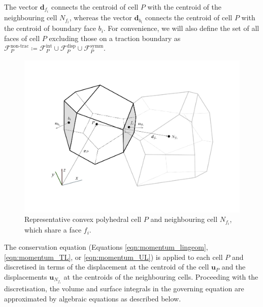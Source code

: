 \documentclass[sn-mathphys,Numbered]{sn-jnl}%
\newcommand{\bb}{\boldsymbol}
\begin{document}
The vector $\mathbf{d}_{f_i}$ connects the centroid of cell $P$ with the centroid of the neighbouring cell $N_{f_i}$, whereas the vector $\mathbf{d}_{b_i}$ connects the centroid of cell $P$ with the centroid of boundary face ${b_i}$.
For convenience, we will also define the set of all faces of cell $P$ excluding those on a traction boundary as $\mathcal{F}_P^{\text{non-trac}} \coloneqq \mathcal{F}_P^{\text{int}} \cup \mathcal{F}_P^{\text{disp}} \cup \mathcal{F}_P^{\text{symm}}$.
\begin{figure}[htbp]
	\centering
   		\includegraphics[width=\textwidth]{figures/cell} 
	\caption{Representative convex polyhedral cell $P$ and neighbouring cell $N_{f_i}$, which share a face $f_i$.}
	\label{fig:cell}
\end{figure}


The conservation equation (Equations \ref{eqn:momentum_lingeom}, \ref{eqn:momentum_TL}, or \ref{eqn:momentum_UL}) is applied to each cell $P$ and discretised in terms of the displacement at the centroid of the cell $\boldsymbol{u}_P$ and the displacements $\boldsymbol{u}_{N_{f_i}}$ at the centroids of the neighbouring cells.
Proceeding with the discretisation, the volume and surface integrals in the governing equation are approximated by algebraic equations as described below.
\end{document}
